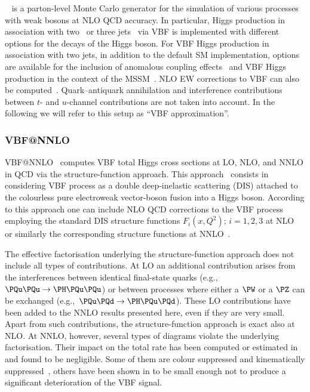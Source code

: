 \VBFNLO~\cite{Arnold:2008rz} is a parton-level Monte Carlo generator for the simulation of various processes 
with weak bosons at NLO QCD accuracy. In particular, Higgs production in association with two~\cite{Figy:2003nv} 
or three jets~\cite{Figy:2007kv} via VBF is implemented with different options for the decays of the Higgs boson. 
For VBF Higgs production in association with two jets, in addition to the default SM implementation, 
options are available for the inclusion of anomalous coupling effects~\cite{Hankele:2006ma} and 
VBF Higgs production in the context of the MSSM~\cite{Figy:2010ct}. NLO EW corrections to VBF can also be computed~\cite{Figy:2010ct}.   
Quark--antiquark annihilation and interference contributions between $t$- and $u$-channel contributions are 
not taken into account. In the following we will refer to this setup as ``VBF approximation''. 


\subsubsection{VBF@NNLO}
\label{sec:VBFNNLO-sub-sub}

{\sc VBF@NNLO}~\cite{Bolzoni:2010xr,Bolzoni:2011cu} computes VBF total Higgs cross sections
at LO, NLO, and NNLO in QCD via the structure-function approach.  This
approach~\cite{Han:1992hr} consists  in considering VBF process as a
double deep-inelastic scattering (DIS) attached to the colourless pure
electroweak vector-boson fusion into a Higgs boson.  According to this
approach one can include NLO QCD corrections to the VBF process employing the
standard DIS structure functions $F_i(x,Q^2);\,i=1,2,3$ at
NLO~\cite{Bardeen:1978yd} or similarly the corresponding structure functions
at NNLO~\cite{Kazakov:1990fu,Zijlstra:1992kj,Zijlstra:1992qd,Moch:1999eb}.

The effective factorisation underlying the structure-function approach does not include all types of contributions.
At LO an additional contribution arises from the
interferences between identical final-state quarks (e.g.,\
$\PQu\PQu\rightarrow \PH\PQu\PQu$) or between processes where either a $\PW$
or a $\PZ$ can be exchanged (e.g.,\ $\PQu\PQd\rightarrow \PH\PQu\PQd$).  These
LO contributions have been added to the NNLO results presented here, even if they are very small.
Apart from such contributions, the structure-function approach is exact also at NLO.
At NNLO, however, several types of diagrams violate the underlying factorisation.
Their impact on the total rate has been computed or estimated in~ and found to be negligible.
Some of them are colour suppressed and kinematically
suppressed~\cite{vanNeerven:1984ak,Blumlein:1992eh,Figy:2007kv}, others have
been shown in \Bref{Harlander:2008xn} to be small enough not to produce
a significant deterioration of the VBF signal.

